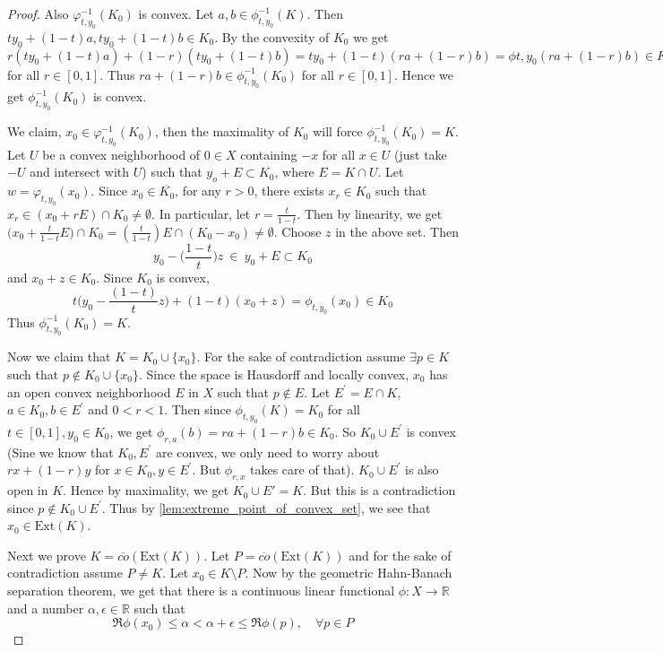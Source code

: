 \begin{proof}
  Also $\varphi_{t, y_0}^{-1}(K_0)$ is convex. Let $a, b \in
  \phi^{-1}_{t, y_0}(K)$. Then $ty_0 + (1-t)a, ty_0 + (1-t)b \in
  K_0$. By the convexity of $K_0$ we get $r(ty_0 + (1-t)a) +
  (1-r)(ty_0 + (1-t)b) = ty_0 + (1-t)(ra + (1-r)b) = \phi{t, y_0}(ra
  + (1-r)b) \in K_0$ for all $r \in [0, 1]$. Thus $ra + (1-r)b \in
  \phi^{-1}_{t, y_0}(K_0)$ for all $r \in [0, 1]$. Hence we get
  $\phi^{-1}_{t, y_0}(K_0)$ is convex.

  We claim, $x_0 \in \varphi_{t, y_0}^{-1}(K_0)$, then the maximality
  of $K_0$ will force $\phi^{-1}_{t, y_0}(K_0) = K$.  Let $U$ be a
  convex neighborhood of $0 \in X$ containing $-x$ for all $x \in U$
  \marginnote{\scriptsize \textcolor{red}{I can't picturize the choice of $z$}}
  (just take $-U$ and intersect with $U$) such that $y_o + E
  \subset K_0$, where $E = K \cap U$. Let $w = \varphi_{t,
  y_0}(x_0)$. Since $x_0 \in
  \overline{K_0}$, for any $r>0$, there exists $x_r \in K_0$ such
  that $x_r \in (x_0 +
  rE) \cap K_0 \neq \emptyset$. In particular, let $r =
  \frac{t}{1-t}$. Then by linearity, we get $\big(x_0 +
  \frac{t}{1-t}E\big) \cap K_0 = ( \frac{t}{1-t}  )E\cap
  (K_0 - x_0) \neq \emptyset$. Choose $z$ in the above set. Then \[
    y_0 - \Big( \frac{1-t}{t} \Big)z \ \in \ y_0 + E \subset K_0
  \]
  and $x_0 + z \in K_0$. Since $K_0$ is convex, \[
    t\Big(y_0 - \frac{(1-t)}{t}z\Big) + (1-t)(x_0 + z)  = \phi_{t,
    y_0}(x_0) \in K_0
  \]
  Thus $\phi^{-1}_{t, y_0}(K_0) = K$.

  Now we claim that $K = K_0 \cup \{ x_0 \}$. For the sake of
  contradiction assume $\exists p \in K$ such that $p \notin K_0 \cup
  \{ x_0 \}$. Since the space is Hausdorff and locally convex, $x_0$ has an
  open convex neighborhood $E$ in $X$ such that $p \not\in E$. Let
  $E^\prime = E \cap K$, $a \in K_0, b \in E^\prime$ and $0 < r < 1$.
  Then since $\phi_{t, y_0}(K) = K_0$ for all $t \in [0, 1], y_0 \in K_0$, we
  get $\phi_{r, a}(b) = ra + (1-r)b \in K_0$. So $K_0 \cup
  E^\prime$ is convex (Sine we know that $K_0, E^\prime$ are convex,
    we only need to worry about $rx + (1-r)y$ for $x \in K_0, y \in
  E^\prime$. But $\phi_{r, x}$ takes care of that). $K_0 \cup
  E^\prime$ is also open in $K$. Hence by maximality, we get $K_0
  \cup E' = K$. But this is a contradiction since $ p \not\in K_0
  \cup E^\prime$. Thus by \autoref{lem:extreme_point_of_convex_set}, we see
  that $x_0 \in \textrm{Ext}(K)$.

  Next we prove $K = \overline{co}(\textrm{Ext}(K))$. Let $P =
  \overline{co}(\textrm{Ext}(K))$ and for the sake of contradiction
  assume $P \neq K$. Let $ x_0 \in K \setminus P$.
  Now by the geometric Hahn-Banach separation theorem, we get that
  there is a continuous linear functional
  $\phi: X \to \mathbb{R}$ and a number $\alpha, \epsilon \in
  \mathbb{R}$ such that \[
    \Re\phi(x_0) \le  \alpha < \alpha + \epsilon \le \Re\phi(p),
    \quad  \forall p \in P
  \]


\end{proof}
